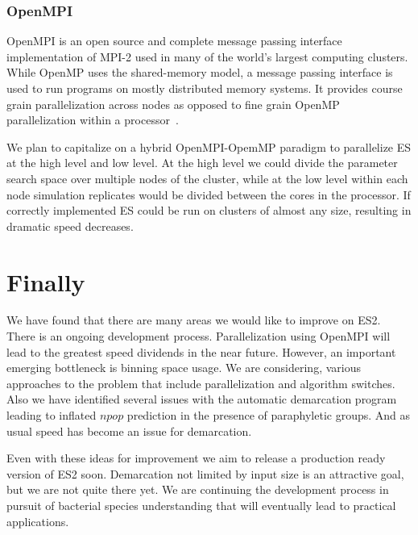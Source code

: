 \subsubsection*{OpenMPI}
OpenMPI is an open source and complete message passing interface implementation of MPI-2 used in many of the world's largest computing clusters.
While OpenMP uses the shared-memory model, a message passing interface is used to run programs on mostly distributed memory systems.
It provides course grain parallelization across nodes as opposed to fine grain OpenMP parallelization within a processor~\cite{gabriel04:_open_mpi}.

We plan to capitalize on a hybrid OpenMPI-OpemMP paradigm to parallelize ES at the high level and low level.
At the high level we could divide the parameter search space over multiple nodes of the cluster, while at the low level within each node simulation replicates would be divided between the cores in the processor.
If correctly implemented ES could be run on clusters of almost any size, resulting in dramatic speed decreases.



\section{Finally}
We have found that there are many areas we would like to improve on ES2.
There is an ongoing development process.
Parallelization using OpenMPI will lead to the greatest speed dividends in the near future.
However, an important emerging bottleneck is binning space usage.
We are considering, various approaches to the problem that include parallelization and algorithm switches.
Also we have identified several issues with the automatic demarcation program leading to inflated $npop$ prediction in the presence of paraphyletic groups.
And as usual speed has become an issue for demarcation.

Even with these ideas for improvement we aim to release a production ready version of ES2 soon.
Demarcation not limited by input size is an attractive goal, but we are not quite there yet.
We are continuing the development process in pursuit of bacterial species understanding that will eventually lead to practical applications.

